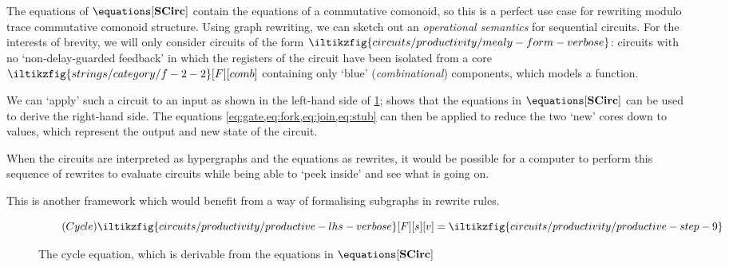 The equations of \(\equations[\mathbf{SCirc}]\) contain the equations of a
commutative comonoid, so this is a perfect use case for rewriting modulo
trace commutative comonoid structure.
Using graph rewriting, we can sketch out an \emph{operational semantics} for
sequential circuits.
For the interests of brevity, we will only consider circuits of the form \(
    \iltikzfig{circuits/productivity/mealy-form-verbose}
\): circuits with no `non-delay-guarded feedback' in which the registers of the
circuit have been isolated from a core \(
    \iltikzfig{strings/category/f-2-2}[F][comb]
\) containing only `blue' (\emph{combinational}) components, which models a
function.

We can `apply' such a circuit to an input as shown in the left-hand side of
\cref{fig:cycle}; \cite[Thm. 104]{ghica2022compositional} shows that the
equations in \(\equations[\mathbf{SCirc}]\) can be used to derive the right-hand
side.
The equations \eqref{eq:gate,eq:fork,eq:join,eq:stub} can then be applied to
reduce the two `new' cores down to values, which represent the output and new
state of the circuit.

When the circuits are interpreted as hypergraphs and the equations as rewrites,
it would be possible for a computer to perform this sequence of rewrites to
evaluate circuits while being able to `peek inside' and see what is going on.

\begin{remark}
    This is another framework which would benefit from a way of formalising
    subgraphs in rewrite rules.
\end{remark}

\begin{figure*}
    \centering
    \begin{equation*}
        \tag{\(\mathsf{Cycle}\)}
        \iltikzfig{circuits/productivity/productive-lhs-verbose}[F][s][v]
        =
        \iltikzfig{circuits/productivity/productive-step-9}
        \label{eq:cycle}
    \end{equation*}
    \caption{
        The cycle equation, which is derivable from the equations in
        \(\equations[\mathbf{SCirc}]\)
    }
    \label{fig:cycle}
\end{figure*}
